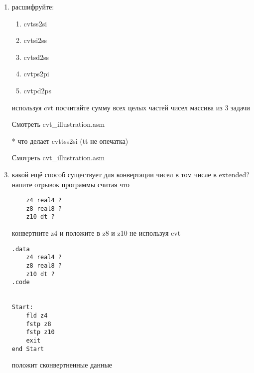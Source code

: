 \documentclass[a4paper,10pt]{article}
\begin{document}
\begin{enumerate}
    \item расшифруйте:
    \begin{enumerate}
        \item cvtss2si 
        \item cvtsi2ss
        \item cvtsd2ss
        \item cvtps2pi
        \item cvtpd2ps 
    \end{enumerate}
    используя cvt посчитайте сумму всех целых частей чисел массива из 3 задачи\par
    Смотреть cvt\_illustration.asm
    \item[*] что делает cvttss2si (tt не опечатка)\par
    Смотреть cvt\_illustration.asm
    \item  какой ещё способ существует для конвертации чисел в том числе в extended? \\
    напите отрывок программы считая что \\
\begin{verbatim}
    z4 real4 ?
    z8 real8 ?
    z10 dt ?
\end{verbatim}
    конвертните z4 и положите в z8 и z10 не используя cvt
\begin{verbatim}
.data
    z4 real4 ?
    z8 real8 ?
    z10 dt ?
.code


Start:
    fld z4
    fstp z8
    fstp z10
    exit
end Start
\end{verbatim}
положит сконвертненные данные
\end{enumerate}
\end{document}
